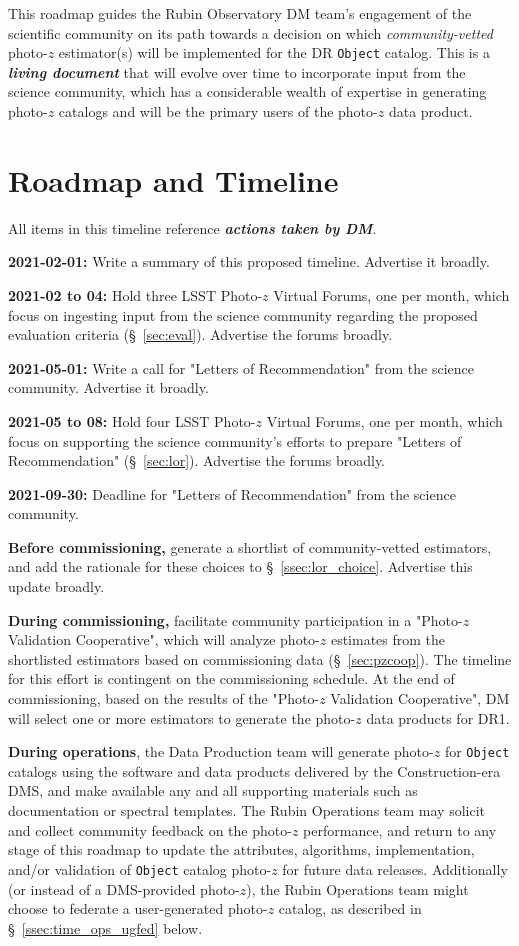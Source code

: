 \documentclass[DM,lsstdraft,toc]{lsstdoc}
\begin{document}
This roadmap guides the Rubin Observatory DM team's engagement of the scientific community on its path towards a decision on which \textit{community-vetted} photo-$z$ estimator(s) will be implemented for the DR {\tt Object} catalog.
This is a \textit{\textbf{living document}} that will evolve over time to incorporate input from the science community, which has a considerable wealth of expertise in generating photo-$z$ catalogs and will be the primary users of the photo-$z$ data product.


\section{Roadmap and Timeline}\label{sec:time}

All items in this timeline reference \textbf{\textit{actions taken by DM}}.

{\bf 2021-02-01:} Write a summary of this proposed timeline. Advertise it broadly.

{\bf 2021-02 to 04:} Hold three LSST Photo-$z$ Virtual Forums, one per month, which focus on ingesting input from the science community regarding the proposed evaluation criteria (\S~\ref{sec:eval}). Advertise the forums broadly.

{\bf 2021-05-01:} Write a call for "Letters of Recommendation" from the science community. Advertise it broadly.

{\bf 2021-05 to 08:} Hold four LSST Photo-$z$ Virtual Forums, one per month, which focus on supporting the science community's efforts to prepare "Letters of Recommendation" (\S~\ref{sec:lor}). Advertise the forums broadly.

{\bf 2021-09-30:} Deadline for "Letters of Recommendation" from the science community.

{\bf Before commissioning,} generate a shortlist of community-vetted estimators, and add the rationale for these choices to \S~\ref{ssec:lor_choice}. Advertise this update broadly.

{\bf During commissioning,} facilitate community participation in a "Photo-$z$ Validation Cooperative", which will analyze photo-$z$ estimates from the shortlisted estimators based on commissioning data (\S~\ref{sec:pzcoop}).
The timeline for this effort is contingent on the commissioning schedule.
At the end of commissioning, based on the results of the "Photo-$z$ Validation Cooperative", DM will select one or more estimators to generate the photo-$z$ data products for DR1.

{\bf During operations}, the Data Production team will generate photo-$z$ for {\tt Object} catalogs using the software and data products delivered by the Construction-era DMS, and make available any and all supporting materials such as documentation or spectral templates.
The Rubin Operations team may solicit and collect community feedback on the photo-$z$ performance, and return to any stage of this roadmap to update the attributes, algorithms, implementation, and/or validation of {\tt Object} catalog photo-$z$ for future data releases.
Additionally (or instead of a DMS-provided photo-$z$), the Rubin Operations team might choose to federate a user-generated photo-$z$ catalog, as described in \S~\ref{ssec:time_ops_ugfed} below.
\end{document}
